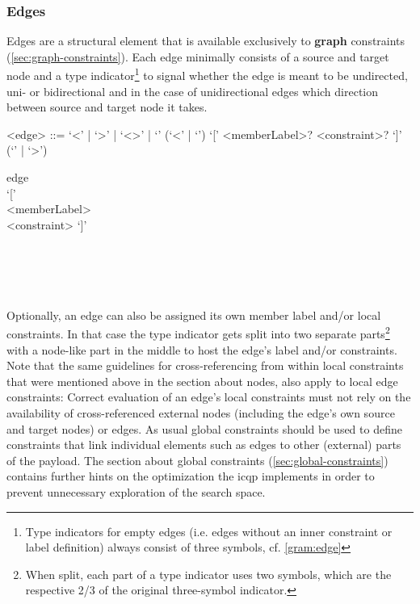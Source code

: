 \documentclass[11pt,a4paper]{report}
\begin{document}
\subsubsection{Edges}
\label{sec:edges}
Edges are a structural element that is available exclusively to \textbf{graph} constraints (\ref{sec:graph-constraints}).
Each edge minimally consists of a source and target node and a type indicator\footnote{Type indicators for empty edges (i.e. edges without an inner constraint or label definition) always consist of three symbols, cf. \cref{gram:edge}} to signal whether the edge is meant to be undirected, uni- or bidirectional and in the case of unidirectional edges which direction between source and target node it takes.

\begin{gram}
	\label{gram:edge}
	\begin{grammar}	
		<edge> ::= `\textless\textminus\textminus' | `\textminus\textminus\textgreater' | `\textless\textminus\textgreater' | `\textminus\textminus\textminus'
		\alt (`\textless\textminus' | `\textminus\textminus') `[' <memberLabel>? <constraint>? `]' (`\textminus\textminus' | `\textminus\textgreater')
	\end{grammar}
	\diagsep
	\begin{rrdiag*}{edge}
		\sst 
		\sst \lit{\textless\textminus} \\ \lit{\textminus\textminus} \est `[' 
		\sst \\ <memberLabel> \est
		\sst \\ <constraint> \est `]' 
		\sst \lit{\textminus\textminus} \\ \lit{\textminus\textgreater} \est \\
		\lit{\textless\textminus\textminus} \\
		\lit{\textminus\textminus\textgreater} \\ 
		\lit{\textless\textminus\textgreater} \\
		\lit{\textminus\textminus\textminus}
		\est
	\end{rrdiag*}
\end{gram}

Optionally, an edge can also be assigned its own member label and/or local constraints.
In that case the type indicator gets split into two separate parts\footnote{When split, each part of a type indicator uses two symbols, which are the respective 2/3 of the original three-symbol indicator.} with a node-like part in the middle to host the edge's label and/or constraints.
Note that the same guidelines for cross-referencing from within local constraints that were mentioned above in the section about nodes, also apply to local edge constraints: 
Correct evaluation of an edge's local constraints must not rely on the availability of cross-referenced external nodes (including the edge's own source and target nodes) or edges.
As usual global constraints should be used to define constraints that link individual elements such as edges to other (external) parts of the payload.
The section about global constraints (\ref{sec:global-constraints}) contains further hints on the optimization the \ac{icqp} implements in order to prevent unnecessary exploration of the search space.
\end{document}
